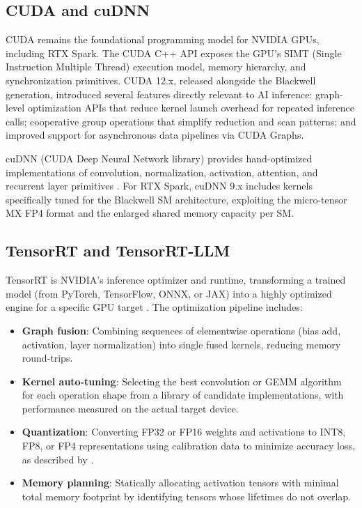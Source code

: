 \documentclass[conference]{IEEEtran}
\begin{document}
\subsection{CUDA and cuDNN}

CUDA remains the foundational programming model for NVIDIA GPUs, including RTX Spark. The CUDA C++ API exposes the GPU's SIMT (Single Instruction Multiple Thread) execution model, memory hierarchy, and synchronization primitives. CUDA 12.x, released alongside the Blackwell generation, introduced several features directly relevant to AI inference: graph-level optimization APIs that reduce kernel launch overhead for repeated inference calls; cooperative group operations that simplify reduction and scan patterns; and improved support for asynchronous data pipelines via CUDA Graphs.

cuDNN (CUDA Deep Neural Network library) provides hand-optimized implementations of convolution, normalization, activation, attention, and recurrent layer primitives \cite{chetlur2014cudnn}. For RTX Spark, cuDNN 9.x includes kernels specifically tuned for the Blackwell SM architecture, exploiting the micro-tensor MX FP4 format and the enlarged shared memory capacity per SM.

\subsection{TensorRT and TensorRT-LLM}

TensorRT is NVIDIA's inference optimizer and runtime, transforming a trained model (from PyTorch, TensorFlow, ONNX, or JAX) into a highly optimized engine for a specific GPU target \cite{nvidia2017tensorrt}. The optimization pipeline includes:

\begin{itemize}
    \item \textbf{Graph fusion}: Combining sequences of elementwise operations (bias add, activation, layer normalization) into single fused kernels, reducing memory round-trips.
    \item \textbf{Kernel auto-tuning}: Selecting the best convolution or GEMM algorithm for each operation shape from a library of candidate implementations, with performance measured on the actual target device.
    \item \textbf{Quantization}: Converting FP32 or FP16 weights and activations to INT8, FP8, or FP4 representations using calibration data to minimize accuracy loss, as described by \cite{dettmers2022gptq}.
    \item \textbf{Memory planning}: Statically allocating activation tensors with minimal total memory footprint by identifying tensors whose lifetimes do not overlap.
\end{itemize}
\end{document}
